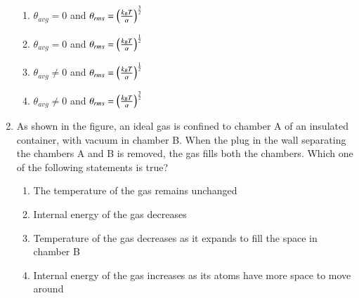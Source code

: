 \documentclass[journal]{IEEEtran}
\begin{document}
\begin{enumerate}
\vspace{0.5 cm}



\begin{enumerate}
\item $\theta_{avg}=0$ and $\theta_{rms}=\left(\frac{k_BT}{\alpha}\right)^{\frac{3}{2}}$
\item $\theta_{avg}=0$ and $\theta_{rms}=\left(\frac{k_BT}{\alpha}\right)^{\frac{1}{2}}$
\item $\theta_{avg}\neq0$ and $\theta_{rms}=\left(\frac{k_BT}{\alpha}\right)^{\frac{1}{2}}$
\item $\theta_{avg}\neq0$ and $\theta_{rms}=\left(\frac{k_BT}{\alpha}\right)^{\frac{3}{2}}$
\end{enumerate}

\item As shown in the figure, an ideal gas is confined to chamber A of an insulated container, with vacuum in chamber B. When the plug in the wall separating the chambers A and B is removed, the gas fills both the chambers. Which one of the following statements is true?



\begin{enumerate}
\item The temperature of the gas remains unchanged
\item Internal energy of the gas decreases
\item Temperature of the gas decreases as it expands to fill the space in chamber B
\item Internal energy of the gas increases as its atoms have more space to move around
\end{enumerate}

\end{enumerate}
\end{document}
